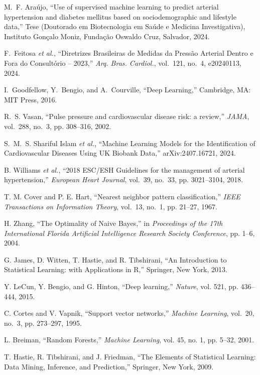 \documentclass[conference]{IEEEtran}
\begin{document}
\begin{thebibliography}{1}

M.~F. Araújo, 
``Use of supervised machine learning to predict arterial hypertension and diabetes mellitus based on sociodemographic and lifestyle data,'' 
Tese (Doutorado em Biotecnologia em Saúde e Medicina Investigativa), Instituto Gonçalo Moniz, Fundação Oswaldo Cruz, Salvador, 2024.

F.~Feitosa \emph{et al.}, 
``Diretrizes Brasileiras de Medidas da Pressão Arterial Dentro e Fora do Consultório – 2023,'' 
\emph{Arq. Bras. Cardiol.}, vol.~121, no.~4, e20240113, 2024.

I.~Goodfellow, Y.~Bengio, and A.~Courville, 
``Deep Learning,'' 
Cambridge, MA: MIT Press, 2016.

R.~S. Vasan, 
``Pulse pressure and cardiovascular disease risk: a review,'' 
\emph{JAMA}, vol.~288, no.~3, pp. 308--316, 2002.

S.~M.~S. Shariful Islam \emph{et al.}, 
``Machine Learning Models for the Identification of Cardiovascular Diseases Using UK Biobank Data,'' 
arXiv:2407.16721, 2024.

B. Williams \emph{et al.},
``2018 ESC/ESH Guidelines for the management of arterial hypertension,''
\emph{European Heart Journal}, vol.~39, no.~33, pp. 3021--3104, 2018.

T. M. Cover and P. E. Hart, 
``Nearest neighbor pattern classification,'' 
\emph{IEEE Transactions on Information Theory}, vol.~13, no.~1, pp. 21--27, 1967.

H. Zhang,
``The Optimality of Naive Bayes,''
in \emph{Proceedings of the 17th International Florida Artificial Intelligence Research Society Conference}, pp. 1--6, 2004.

G. James, D. Witten, T. Hastie, and R. Tibshirani, 
``An Introduction to Statistical Learning: with Applications in R,''
Springer, New York, 2013.

Y. LeCun, Y. Bengio, and G. Hinton, 
``Deep learning,'' 
\emph{Nature}, vol. 521, pp. 436--444, 2015.

C. Cortes and V. Vapnik, 
``Support vector networks,''
\emph{Machine Learning}, vol.~20, no.~3, pp. 273--297, 1995.

L. Breiman, 
``Random Forests,''
\emph{Machine Learning}, vol. 45, no. 1, pp. 5--32, 2001.

T. Hastie, R. Tibshirani, and J. Friedman, 
``The Elements of Statistical Learning: Data Mining, Inference, and Prediction,''
Springer, New York, 2009.

\end{thebibliography}
\end{document}
